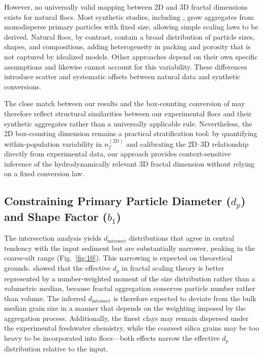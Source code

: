 \documentclass{agujournal2019}
\begin{document}
However, no universally valid mapping between 2D and 3D fractal dimensions exists for natural flocs. Most synthetic studies, including , grow aggregates from monodisperse primary particles with fixed size, allowing simple scaling laws to be derived. Natural flocs, by contrast, contain a broad distribution of particle sizes, shapes, and compositions, adding heterogeneity in packing and porosity that is not captured by idealized models. Other approaches \cite{maggi2004method, tang2015reconstructing} depend on their own specific assumptions and likewise cannot account for this variability. These differences introduce scatter and systematic offsets between natural data and synthetic conversions.

The close match between our results and the box-counting conversion of  may therefore reflect structural similarities between our experimental flocs and their synthetic aggregates rather than a universally applicable rule. Nevertheless, the 2D box-counting dimension remains a practical stratification tool: by quantifying within-population variability in $n_f^{(\mathrm{2D})}$ and calibrating the 2D--3D relationship directly from experimental data, our approach provides context-sensitive inference of the hydrodynamically relevant 3D fractal dimension without relying on a fixed conversion law.

\subsection{Constraining Primary Particle Diameter ($d_p$) and Shape Factor ($b_1$)}
The intersection analysis yields $d_\text{intersect}$ distributions that agree in central tendency with the input sediment but are substantially narrower, peaking in the coarse-silt range (Fig.~\ref{fig:10}). This narrowing is expected on theoretical grounds.  showed that the effective $d_p$ in fractal scaling theory is better represented by a number-weighted moment of the size distribution rather than a volumetric median, because fractal aggregation conserves particle number rather than volume. The inferred $d_\text{intersect}$ is therefore expected to deviate from the bulk median grain size in a manner that depends on the weighting imposed by the aggregation process. Additionally, the finest clays may remain dispersed under the experimental freshwater chemistry, while the coarsest silica grains may be too heavy to be incorporated into flocs---both effects narrow the effective $d_p$ distribution relative to the input. 
\end{document}
